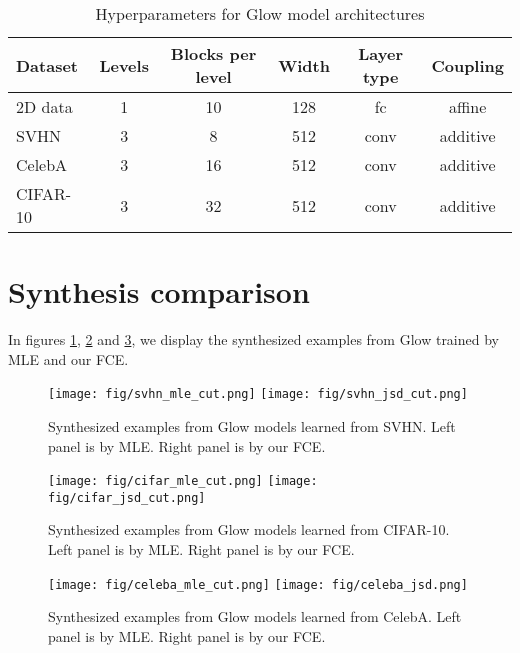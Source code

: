 \documentclass[10pt,twocolumn,letterpaper]{article}
\begin{document}
\begin{table*}[h]
	\centering
	\caption{Hyperparameters for Glow model architectures}
	\label{tab: glow-arch}
	\begin{tabular}{lccccc}
		\toprule
		Dataset & Levels  & Blocks per level  & Width  & Layer type & Coupling\\
		\midrule 
		2D data & 1 & 10 & 128 & fc & affine \\
		SVHN & 3 & 8 & 512 & conv & additive \\
		CelebA & 3 & 16 & 512 & conv & additive \\
		CIFAR-10 & 3 & 32 & 512 & conv & additive \\
		\bottomrule
	\end{tabular}
\end{table*}

\section{Synthesis comparison}
In figures \ref{fig: svhn_compare}, \ref{fig: cifar_compare} and \ref{fig: celeba_compare}, we display the synthesized examples from Glow trained by MLE and our FCE.  

\begin{figure}[h]
\centering
	\texttt{[image: fig/svhn\_mle\_cut.png]}
	\hspace{0.1cm}
	\texttt{[image: fig/svhn\_jsd\_cut.png]}
	\caption{Synthesized examples from Glow models learned from SVHN. Left panel is by MLE. Right panel is by our FCE. }
	\label{fig: svhn_compare}
\end{figure}

\begin{figure}[h]
\centering
	\texttt{[image: fig/cifar\_mle\_cut.png]}
	\hspace{0.1cm}
	\texttt{[image: fig/cifar\_jsd\_cut.png]}
	\caption{Synthesized examples from Glow models learned from CIFAR-10. Left panel is by MLE. Right panel is by our FCE. }
	\label{fig: cifar_compare}
\end{figure}


\begin{figure}[h]
\centering
	\texttt{[image: fig/celeba\_mle\_cut.png]}
	\hspace{0.1cm}
	\texttt{[image: fig/celeba\_jsd.png]}
	\caption{Synthesized examples from Glow models learned from CelebA. Left panel is by MLE. Right panel is by our FCE. }
	\label{fig: celeba_compare}
\end{figure}
\end{document}
